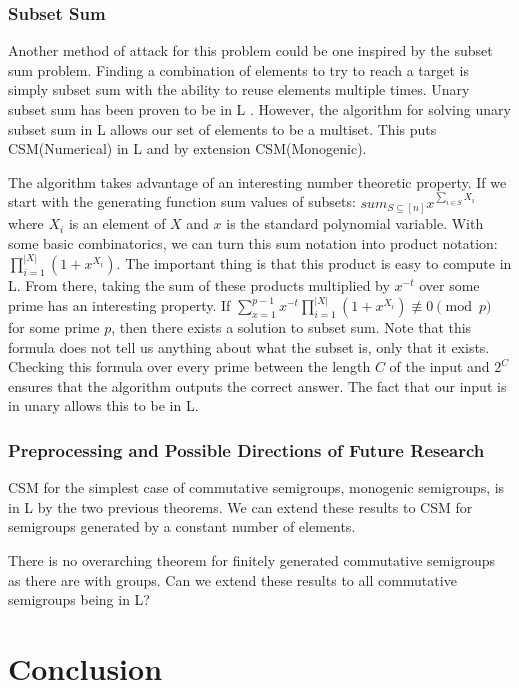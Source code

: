 \documentclass[a4paper,12pt]{article}
\theoremstyle{plain}
\theoremstyle{definition}
\theoremstyle{remark}
\begin{document}
\subsubsection{Subset Sum}
Another method of attack for this problem could be one inspired by the subset sum problem. Finding a combination of elements to try to reach a target is simply subset sum with the ability to reuse elements multiple times. Unary subset sum has been proven to be in L \cite{kane2017unary}. However, the algorithm for solving unary subset sum in L allows our set of elements to be a multiset. This puts CSM(Numerical) in L and by extension CSM(Monogenic). \vspace{\baselineskip}

The algorithm takes advantage of an interesting number theoretic property. If we start with the generating function sum values of subsets: $sum_{S\subseteq[n]}x^{\sum_{i\in S}X_i}$ where $X_i$ is an element of $X$ and $x$ is the standard polynomial variable. With some basic combinatorics, we can turn this sum notation into product notation: $\prod_{i=1}^{|X|}(1+x^{X_i})$. The important thing is that this product is easy to compute in L. From there, taking the sum of these products multiplied by $x^{-t}$ over some prime has an interesting property. If $\sum_{x=1}^{p-1}x^{-t}\prod_{i=1}^{|X|}(1+x^{X_i})\not\equiv0\pmod{p}$ for some prime $p$, then there exists a solution to subset sum. Note that this formula does not tell us anything about what the subset is, only that it exists. Checking this formula over every prime between the length $C$ of the input and $2^C$ ensures that the algorithm outputs the correct answer. The fact that our input is in unary allows this to be in L.

\subsubsection{Preprocessing and Possible Directions of Future Research}

CSM for the simplest case of commutative semigroups, monogenic semigroups, is in L by the two previous theorems. We can extend these results to CSM for semigroups generated by a constant number of elements. \vspace{\baselineskip} 
  
There is no overarching theorem for finitely generated commutative semigroups as there are with groups. Can we extend these results to all commutative semigroups being in L?

\section{Conclusion}
\end{document}
